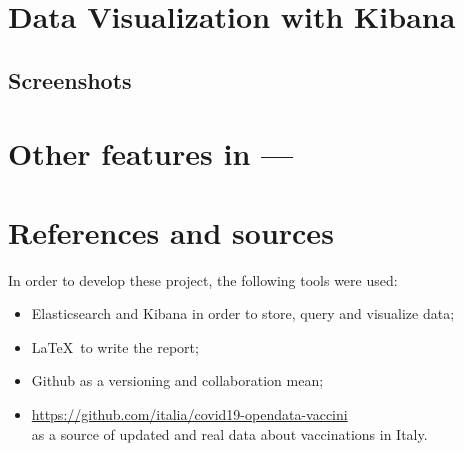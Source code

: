 \documentclass[12pt, a4paper]{article}
\begin{document}
\begin{tcolorbox}[fontupper=\scriptsize]
    \begin{verbatim}
    \end{verbatim}
\end{tcolorbox}

\noindent
\blindtext

\clearpage

\section{Data Visualization with Kibana}

\blindtext

\subsection{Screenshots}

\blindtext

\clearpage

\section{Other features in ---} 

\blindtext

\clearpage

\section{References and sources}

In order to develop these project, the following tools were used:

\begin{itemize}
    \item Elasticsearch and Kibana in order to store, query and visualize data;
    \item \LaTeX~to write the report;
    \item Github as a versioning and collaboration mean;
    \item \url{https://github.com/italia/covid19-opendata-vaccini} \\
        as a source of updated and real data about vaccinations in Italy.
\end{itemize}

\clearpage
\end{document}
